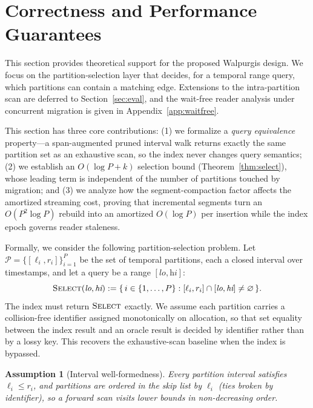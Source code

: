 \documentclass{article}
\newtheorem{assumption}{Assumption}
\begin{document}
\section{Correctness and Performance Guarantees}
\label{sec:guarantees}

This section provides theoretical support for the proposed Walpurgis design. We focus
on the partition-selection layer that decides, for a temporal range query, which
partitions can contain a matching edge. Extensions to the intra-partition scan are
deferred to Section~\ref{sec:eval}, and the wait-free reader analysis under concurrent
migration is given in Appendix~\ref{app:waitfree}.

This section has three core contributions: (1) we formalize a \emph{query equivalence}
property---a span-augmented pruned interval walk returns exactly the same partition set
as an exhaustive scan, so the index never changes query semantics; (2) we establish an
$O(\log P + k)$ selection bound (Theorem~\ref{thm:select}), whose leading term is
independent of the number of partitions touched by migration; and (3) we analyze how the
segment-compaction factor affects the amortized streaming cost, proving that incremental
segments turn an $O(P^2 \log P)$ rebuild into an amortized $O(\log P)$ per insertion
while the index epoch governs reader staleness.

Formally, we consider the following partition-selection problem. Let
$\mathcal{P} = \{[\ell_i, r_i]\}_{i=1}^{P}$ be the set of temporal partitions, each a
closed interval over timestamps, and let a query be a range $[\textit{lo}, \textit{hi}]$:
\begin{equation}
\textsc{Select}(\textit{lo}, \textit{hi}) := \{\, i \in \{1,\dots,P\} : [\ell_i, r_i] \cap [\textit{lo}, \textit{hi}] \neq \varnothing \,\}.
\label{eq:select}
\end{equation}
The index must return $\textsc{Select}$ exactly. We assume each partition carries a
collision-free identifier assigned monotonically on allocation, so that set equality
between the index result and an oracle result is decided by identifier rather than by a
lossy key. This recovers the exhaustive-scan baseline when the index is bypassed.

\begin{assumption}[Interval well-formedness]
\label{asm:wellformed}
Every partition interval satisfies $\ell_i \leq r_i$, and partitions are ordered in the
skip list by $\ell_i$ (ties broken by identifier), so a forward scan visits lower bounds
in non-decreasing order.
\end{assumption}
\end{document}

